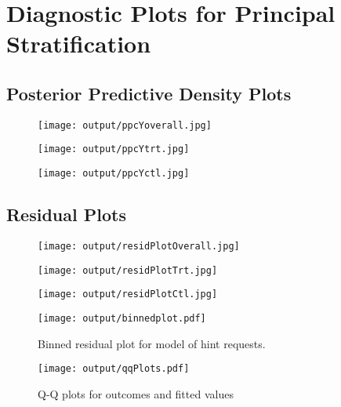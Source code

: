 \documentclass{article}\usepackage[]{graphicx}\usepackage[]{color}
\begin{document}
\section{Diagnostic Plots for Principal Stratification}



\subsection{Posterior Predictive Density Plots}
\begin{figure}[!h]
\centering
\texttt{[image: output/ppcYoverall.jpg]}
\end{figure}

\begin{figure}[!h]
\centering
\texttt{[image: output/ppcYtrt.jpg]}
\end{figure}

\begin{figure}[!h]
\centering
\texttt{[image: output/ppcYctl.jpg]}
\end{figure}

\subsection{Residual Plots}
\begin{figure}[!h]
\centering
\texttt{[image: output/residPlotOverall.jpg]}
\end{figure}

\begin{figure}[!h]
\centering
\texttt{[image: output/residPlotTrt.jpg]}
\end{figure}

\begin{figure}[!h]
\centering
\texttt{[image: output/residPlotCtl.jpg]}
\end{figure}

\begin{figure}[!h]
\centering
\texttt{[image: output/binnedplot.pdf]}
\caption{Binned residual plot for model of hint requests.}
\end{figure}


\begin{figure}[!h]
\centering
\texttt{[image: output/qqPlots.pdf]}
\caption{Q-Q plots for outcomes and fitted values}
\end{figure}
\end{document}
